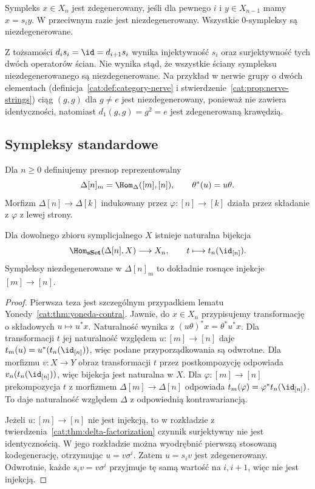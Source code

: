 \begin{definicja}\label{cat:def:degenerate-simplex}
Sympleks $x\in X_n$ jest zdegenerowany, jeśli dla pewnego $i$ i $y\in X_{n-1}$ mamy $x=s_i y$. W przeciwnym razie jest niezdegenerowany. Wszystkie $0$-sympleksy są niezdegenerowane.
\end{definicja}
Z tożsamości $d_i s_i=\id=d_{i+1}s_i$ wynika injektywność $s_i$ oraz surjektywność tych dwóch operatorów ścian. Nie wynika stąd, że wszystkie ściany sympleksu niezdegenerowanego są niezdegenerowane. Na przykład w nerwie grupy o dwóch elementach (definicja~\ref{cat:def:category-nerve} i stwierdzenie~\ref{cat:prop:nerve-strings}) ciąg $(g,g)$ dla $g\ne e$ jest niezdegenerowany, ponieważ nie zawiera identyczności, natomiast $d_1(g,g)=g^2=e$ jest zdegenerowaną krawędzią.

\subsection{Sympleksy standardowe}

\begin{definicja}\label{cat:def:standard-simplicial-simplex}
Dla $n\geq0$ definiujemy presnop reprezentowalny
\[
 \Delta[n]_m=\Hom_\Delta([m],[n]),\qquad
 \theta^*(u)=u\theta.
\]
Morfizm $\Delta[n]\to\Delta[k]$ indukowany przez $\varphi:[n]\to[k]$ działa przez składanie z $\varphi$ z lewej strony.
\end{definicja}

\begin{stwierdzenie}\label{cat:prop:simplicial-yoneda}
Dla dowolnego zbioru symplicjalnego $X$ istnieje naturalna bijekcja
\[
 \Hom_{\mathbf{sSet}}(\Delta[n],X)\longrightarrow X_n,
 \qquad t\longmapsto t_n(\id_{[n]}).
\]
Sympleksy niezdegenerowane w $\Delta[n]_m$ to dokładnie rosnące injekcje $[m]\to[n]$.
\end{stwierdzenie}
\begin{proof}
Pierwsza teza jest szczególnym przypadkiem lematu Yonedy~\ref{cat:thm:yoneda-contra}. Jawnie, do $x\in X_n$ przypisujemy transformację o składowych $u\mapsto u^*x$. Naturalność wynika z $(u\theta)^*x=\theta^*u^*x$. Dla transformacji $t$ jej naturalność względem $u:[m]\to[n]$ daje $t_m(u)=u^*(t_n(\id_{[n]}))$, więc podane przyporządkowania są odwrotne. Dla morfizmu $v:X\to Y$ obraz transformacji $t$ przez postkompozycję odpowiada $v_n(t_n(\id_{[n]}))$, więc bijekcja jest naturalna w $X$. Dla $\varphi:[m]\to[n]$ prekompozycja $t$ z morfizmem $\Delta[m]\to\Delta[n]$ odpowiada $t_m(\varphi)=\varphi^*t_n(\id_{[n]})$. To daje naturalność względem $\Delta$ z odpowiednią kontrawariancją.

Jeżeli $u:[m]\to[n]$ nie jest injekcją, to w rozkładzie z twierdzenia~\ref{cat:thm:delta-factorization} czynnik surjektywny nie jest identycznością. W jego rozkładzie można wyodrębnić pierwszą stosowaną kodegenerację, otrzymując $u=v\sigma^i$. Zatem $u=s_i v$ jest zdegenerowany. Odwrotnie, każde $s_i v=v\sigma^i$ przyjmuje tę samą wartość na $i,i+1$, więc nie jest injekcją.
\end{proof}

